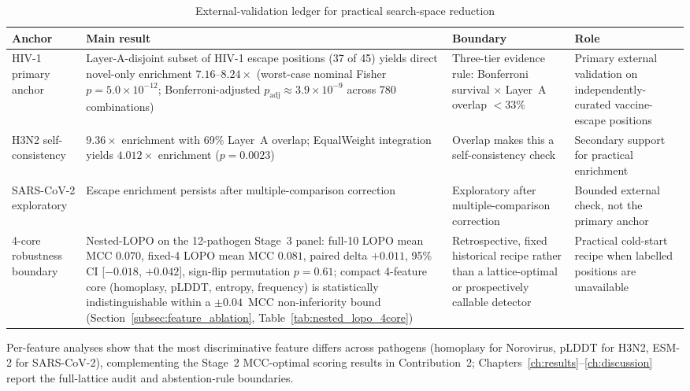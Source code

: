 \begin{table}[htbp]
\centering
\caption{External-validation ledger for practical search-space reduction}
\label{tab:intro_external_validation_ledger}
\small
\begin{tabularx}{\textwidth}{p{}p{}p{}X}
\toprule
\textbf{Anchor} & \textbf{Main result} & \textbf{Boundary} & \textbf{Role} \\
\midrule
HIV-1 primary anchor & Layer-A-disjoint subset of HIV-1 escape positions (37 of 45) yields direct novel-only enrichment $7.16\text{--}8.24\times$ (worst-case nominal Fisher $p = 5.0 \times 10^{-12}$; Bonferroni-adjusted $p_{\text{adj}} \approx 3.9 \times 10^{-9}$ across 780 combinations) & Three-tier evidence rule: Bonferroni survival $\times$ Layer~A overlap $<33\%$ & Primary external validation on independently-curated vaccine-escape positions \\
H3N2 self-consistency & $9.36\times$ enrichment with 69\% Layer~A overlap; EqualWeight integration yields $4.012\times$ enrichment ($p = 0.0023$) & Overlap makes this a self-consistency check & Secondary support for practical enrichment \\
SARS-CoV-2 exploratory & Escape enrichment persists after multiple-comparison correction & Exploratory after multiple-comparison correction & Bounded external check, not the primary anchor \\
4-core robustness boundary & Nested-LOPO on the 12-pathogen Stage~3 panel: full-10 LOPO mean MCC $0.070$, fixed-4 LOPO mean MCC $0.081$, paired delta $+0.011$, 95\% CI [$-0.018$, $+0.042$], sign-flip permutation $p = 0.61$; compact 4-feature core (homoplasy, pLDDT, entropy, frequency) is statistically indistinguishable within a $\pm 0.04$~MCC non-inferiority bound (Section~\ref{subsec:feature_ablation}, Table~\ref{tab:nested_lopo_4core}) & Retrospective, fixed historical recipe rather than a lattice-optimal or prospectively callable detector & Practical cold-start recipe when labelled positions are unavailable \\
\bottomrule
\end{tabularx}
\end{table}

Per-feature analyses show that the most discriminative feature differs across pathogens (homoplasy for Norovirus, pLDDT for H3N2, ESM-2 for SARS-CoV-2), complementing the Stage~2 MCC-optimal scoring results in Contribution~2; Chapters~\ref{ch:results}--\ref{ch:discussion} report the full-lattice audit and abstention-rule boundaries.

